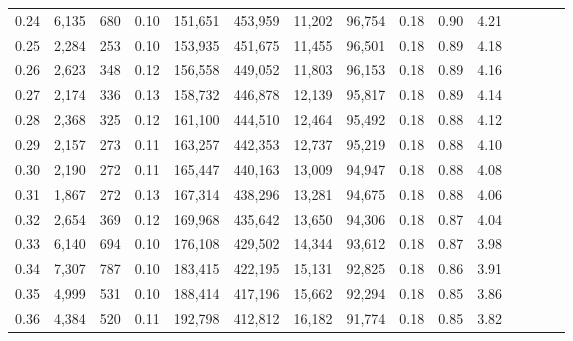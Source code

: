 \begin{tabular}{rrrcrrrrrrrrrrr}
0.24 &   6,135 &     680 &                                       0.10 &  151,651 &  453,959 &   11,202 &   96,754 &  0.18 &  0.90 &                         4.21 \\
0.25 &   2,284 &     253 &                                       0.10 &  153,935 &  451,675 &   11,455 &   96,501 &  0.18 &  0.89 &                         4.18 \\
0.26 &   2,623 &     348 &                                       0.12 &  156,558 &  449,052 &   11,803 &   96,153 &  0.18 &  0.89 &                         4.16 \\
0.27 &   2,174 &     336 &                                       0.13 &  158,732 &  446,878 &   12,139 &   95,817 &  0.18 &  0.89 &                         4.14 \\
0.28 &   2,368 &     325 &                                       0.12 &  161,100 &  444,510 &   12,464 &   95,492 &  0.18 &  0.88 &                         4.12 \\
0.29 &   2,157 &     273 &                                       0.11 &  163,257 &  442,353 &   12,737 &   95,219 &  0.18 &  0.88 &                         4.10 \\
0.30 &   2,190 &     272 &                                       0.11 &  165,447 &  440,163 &   13,009 &   94,947 &  0.18 &  0.88 &                         4.08 \\
0.31 &   1,867 &     272 &                                       0.13 &  167,314 &  438,296 &   13,281 &   94,675 &  0.18 &  0.88 &                         4.06 \\
0.32 &   2,654 &     369 &                                       0.12 &  169,968 &  435,642 &   13,650 &   94,306 &  0.18 &  0.87 &                         4.04 \\
0.33 &   6,140 &     694 &                                       0.10 &  176,108 &  429,502 &   14,344 &   93,612 &  0.18 &  0.87 &                         3.98 \\
0.34 &   7,307 &     787 &                                       0.10 &  183,415 &  422,195 &   15,131 &   92,825 &  0.18 &  0.86 &                         3.91 \\
0.35 &   4,999 &     531 &                                       0.10 &  188,414 &  417,196 &   15,662 &   92,294 &  0.18 &  0.85 &                         3.86 \\
0.36 &   4,384 &     520 &                                       0.11 &  192,798 &  412,812 &   16,182 &   91,774 &  0.18 &  0.85 &                         3.82 \\

\end{tabular}
